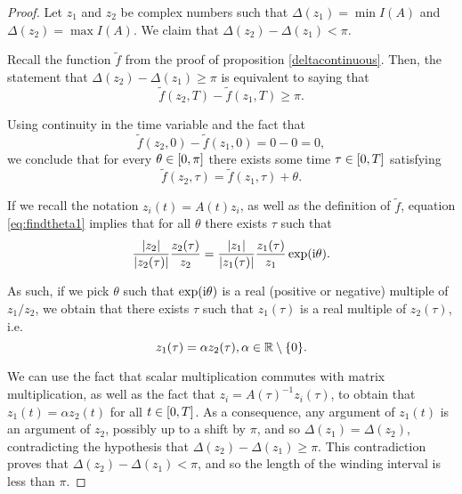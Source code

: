 \begin{proof}
Let $z_1$ and $z_2$ be complex numbers such that $\Delta(z_1) = \min I(A)$ and $\Delta(z_2) = \max I(A)$. We claim that $\Delta(z_2) - \Delta(z_1) < \pi$.

Recall the function $\tilde f$ from the proof of proposition \ref{deltacontinuous}. Then, the statement that $\Delta(z_2) - \Delta(z_1) \geq \pi$ is equivalent to saying that
\begin{equation}
\tilde f(z_2, T) - \tilde f(z_1, T) \geq \pi.
\end{equation}

Using continuity in the time variable and the fact that
\begin{equation}
\tilde f(z_2, 0) - \tilde f(z_1, 0) = 0 - 0 = 0,
\end{equation}
we conclude that for every $\theta \in \interval 0 \pi$ there exists some time $\tau \in \interval 0 T$ satisfying
\begin{equation}\label{eq:findtheta1}
\tilde f(z_2, \tau) = \tilde f(z_1, \tau) + \theta.
\end{equation}

If we recall the notation $z_i(t) = A(t) z_i$, as well as the definition of $\tilde f$, equation \eqref{eq:findtheta1} implies that for all $\theta$ there exists $\tau$ such that
\begin{equation}\label{eq:findtheta2}
\frac{\lvert z_2\rvert}{\lvert z_2(\tau)\rvert} \frac{z_2(\tau)}{z_2} = \frac{\lvert z_1\rvert}{\lvert z_1(\tau)\rvert} \frac{z_1(\tau)}{z_1} \exp(\mathrm{i} \theta).	
\end{equation}

As such, if we pick $\theta$ such that $\exp(\mathrm{i} \theta)$ is a real (positive or negative) multiple of $z_1 / z_2$, we obtain that there exists $\tau$ such that $z_1(\tau)$ is a real multiple of $z_2(\tau)$, i.e.
\begin{equation}
z_1(\tau) = \alpha z_2(\tau), \alpha \in \mathbb{R} \setminus \{0\}.
\end{equation}

We can use the fact that scalar multiplication commutes with matrix multiplication, as well as the fact that $z_i = A(\tau)^{-1} z_i(\tau)$, to obtain that $z_1(t) = \alpha z_2(t)$ for all $t \in \interval 0 T$. As a consequence, any argument of $z_1(t)$ is an argument of $z_2$, possibly up to a shift by $\pi$, and so $\Delta(z_1) = \Delta(z_2)$, contradicting the hypothesis that $\Delta(z_2) - \Delta(z_1) \geq \pi$. This contradiction proves that $\Delta(z_2) - \Delta(z_1) < \pi$, and so the length of the winding interval is less than $\pi$.
\end{proof}

